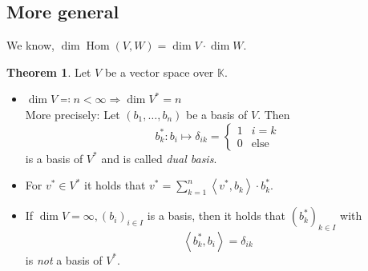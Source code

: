 \documentclass[a4paper,landscape,twocolumn]{article}
\newcommand\functional[1]{\left\langle{#1}\right\rangle}
\theoremstyle{definition}
\newtheorem{theorem}{Theorem}
\DeclareMathOperator\Hom{Hom} %
\begin{document}
\subsection{More general}
%
%
We know, $\dim{\Hom(V,W)} = \dim{V} \cdot \dim{W}$.
\begin{theorem}
  \label{5.26}
  Let $V$ be a vector space over $\mathbb K$.
  \begin{itemize}
    \item $\dim{V} \eqqcolon n < \infty \Rightarrow \dim{V^*} = n$ \\
      More precisely: Let $(b_1, \ldots, b_n)$ be a basis of $V$.
      Then \[
        b_k^*: b_i \mapsto \delta_{ik} = \begin{cases} 1 & i = k \\ 0 & \text{else} \end{cases}
      \]
      is a basis of $V^*$ and is called \emph{dual basis}.
    \item For $v^* \in V^*$ it holds that $v^* = \sum_{k=1}^n \functional{v^*, b_k} \cdot b_k^*$.
    \item If $\dim{V} = \infty, (b_i)_{i \in I}$ is a basis, then it holds that $(b^*_k)_{k \in I}$ with
      \[ \functional{b_k^*, b_i} = \delta_{ik} \]
      is \emph{not} a basis of $V^*$.
  \end{itemize}
\end{theorem}
\end{document}
